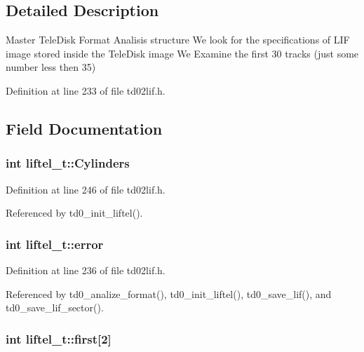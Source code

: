 \subsection{Detailed Description}
Master Tele\+Disk Format Analisis structure We look for the specifications of L\+IF image stored inside the Tele\+Disk image We Examine the first 30 tracks (just some number less then 35) 

Definition at line 233 of file td02lif.\+h.



\subsection{Field Documentation}
\subsubsection[{\texorpdfstring{Cylinders}{Cylinders}}]{\setlength{\rightskip}{0pt plus 5cm}int liftel\+\_\+t\+::\+Cylinders}\hypertarget{structliftel__t_aa7893691b509641459d8c1c0a8664aa5}{}\label{structliftel__t_aa7893691b509641459d8c1c0a8664aa5}


Definition at line 246 of file td02lif.\+h.



Referenced by td0\+\_\+init\+\_\+liftel().

\subsubsection[{\texorpdfstring{error}{error}}]{\setlength{\rightskip}{0pt plus 5cm}int liftel\+\_\+t\+::error}\hypertarget{structliftel__t_abc69ee3835be72037c41a11b7457cecd}{}\label{structliftel__t_abc69ee3835be72037c41a11b7457cecd}


Definition at line 236 of file td02lif.\+h.



Referenced by td0\+\_\+analize\+\_\+format(), td0\+\_\+init\+\_\+liftel(), td0\+\_\+save\+\_\+lif(), and td0\+\_\+save\+\_\+lif\+\_\+sector().

\subsubsection[{\texorpdfstring{first}{first}}]{\setlength{\rightskip}{0pt plus 5cm}int liftel\+\_\+t\+::first\mbox{[}2\mbox{]}}\hypertarget{structliftel__t_a2269b4ce15afd4b98369c38752d31037}{}\label{structliftel__t_a2269b4ce15afd4b98369c38752d31037}


